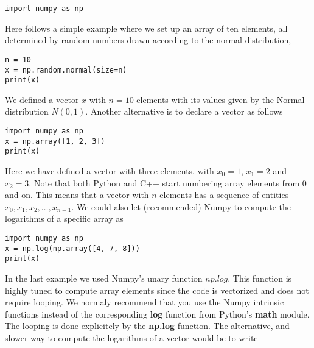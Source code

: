 \documentclass[%
oneside,                 %
final,                   %
10pt]{article}
\begin{document}
\begin{verbatim}
import numpy as np

\end{verbatim}

Here follows a simple example where we set up an array of ten elements, all determined by random numbers drawn according to the normal distribution,




\begin{verbatim}
n = 10
x = np.random.normal(size=n)
print(x)

\end{verbatim}

We defined a vector $x$ with $n=10$ elements with its values given by the Normal distribution $N(0,1)$.
Another alternative is to declare a vector as follows




\begin{verbatim}
import numpy as np
x = np.array([1, 2, 3])
print(x)

\end{verbatim}

Here we have defined a vector with three elements, with $x_0=1$, $x_1=2$ and $x_2=3$. Note that both Python and C++
start numbering array elements from $0$ and on. This means that a vector with $n$ elements has a sequence of entities $x_0, x_1, x_2, \dots, x_{n-1}$. We could also let (recommended) Numpy to compute the logarithms of a specific array as




\begin{verbatim}
import numpy as np
x = np.log(np.array([4, 7, 8]))
print(x)

\end{verbatim}


In the last example we used Numpy's unary function $np.log$. This function is
highly tuned to compute array elements since the code is vectorized
and does not require looping. We normaly recommend that you use the
Numpy intrinsic functions instead of the corresponding \textbf{log} function
from Python's \textbf{math} module. The looping is done explicitely by the
\textbf{np.log} function. The alternative, and slower way to compute the
logarithms of a vector would be to write
\end{document}
